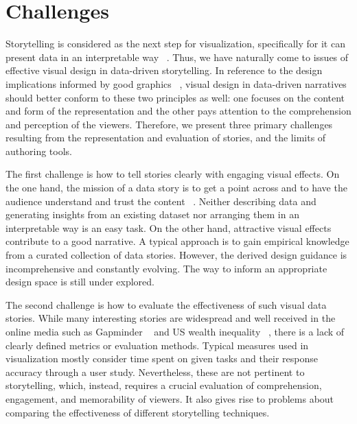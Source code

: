 \section{Challenges}
Storytelling is considered as the next step for visualization, specifically for it can present data in an interpretable way ~\cite{Kosara2013}. Thus, we have naturally come to issues of effective visual design in data-driven storytelling. In reference to the design implications informed by good graphics ~\cite{Tversky2002}, visual  design in data-driven narratives should better conform to these two principles as well: one focuses on the content and form of the representation and the other pays attention to the comprehension and perception of the viewers. Therefore, we present three primary challenges resulting from the representation and evaluation of stories, and the limits of authoring tools. 

The first challenge is how to tell stories clearly with engaging visual effects. On the one hand, the mission of a data story is to get a point across and to have the audience understand and trust the content ~\cite{Kosara2013}. Neither describing data and generating insights from an existing dataset nor arranging them in an interpretable way is an easy task.
On the other hand, attractive visual effects contribute to a good narrative. A typical approach is to gain empirical knowledge from a curated collection of data stories. However, the derived design guidance is incomprehensive and constantly evolving. The way to inform an appropriate design space is still under explored.


The second challenge is how to evaluate the effectiveness of such visual data stories. While many interesting stories are widespread and well received in the online media such as Gapminder ~\cite{gapminder} and US wealth inequality ~\cite{inequality}, there is a lack of clearly defined metrics or evaluation methods. Typical measures used in visualization mostly consider time spent on given tasks and their response accuracy through a user study. Nevertheless, these are not pertinent to storytelling, which, instead, requires a crucial evaluation of comprehension, engagement, and memorability of viewers. It also gives rise to problems about comparing the effectiveness of different storytelling techniques. 



